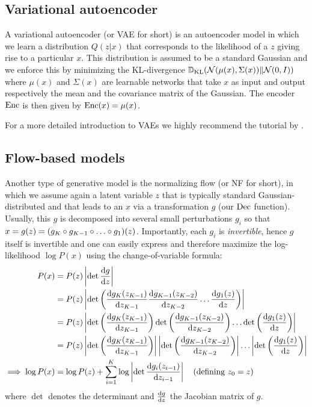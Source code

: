 \documentclass[../main.tex]{subfiles}
\begin{document}
\subsection{Variational autoencoder}

A variational autoencoder (or VAE for short) is an autoencoder model in which we learn a distribution $Q(z | x)$ that corresponds to the likelihood of a $z$ giving rise to a particular $x$.
This distribution is assumed to be a standard Gaussian and we enforce this by minimizing the KL-divergence $\mathbb{D}_\text{KL}(\mathcal{N}(\mu(x), \Sigma(x)) \| \mathcal{N}(0, I))$ where $\mu(x)$ and $\Sigma(x)$ are learnable networks that take $x$ as input and output respectively the mean and the covariance matrix of the Gaussian.
The encoder $\operatorname{Enc}$ is then given by $\operatorname{Enc}(x) = \mu(x)$.

For a more detailed introduction to VAEs we highly recommend the tutorial by \citeauthor{doerschTutorial2021} \cite{doerschTutorial2021}.

\subsection{Flow-based models}

Another type of generative model is the normalizing flow (or NF for short), in which we assume again a latent variable $z$ that is typically standard Gaussian-distributed and that leads to an $x$ via a transformation $g$ (our $\operatorname{Dec}$ function).
Usually, this $g$ is decomposed into several small perturbations $g_i$ so that $x = g(z) = (g_K \circ g_{K-1} \circ \ldots \circ g_1) (z)$.
Importantly, each $g_i$ is \emph{invertible}, hence $g$ itself is invertible and one can easily express and therefore maximize the log-likelihood $\log P(x)$ using the change-of-variable formula:
%
\begin{align*}
    P(x)               & = P(z) \left\lvert \det \frac{\mathrm{d} g}{\mathrm{d} z} \right\rvert       \\
                       & = P(z) \left\lvert \det \left(
        \frac{\mathrm{d} g_K(z_{K-1})}{\mathrm{d} z_{K-1}}
        \frac{\mathrm{d} g_{K-1}(z_{K-2})}{\mathrm{d} z_{K-2}}
        \ldots
        \frac{\mathrm{d} g_1(z)}{\mathrm{d} z}
    \right)\right\rvert                                                   \\
                       & = P(z) \left\lvert
        \det \left(
        \frac{\mathrm{d} g_K(z_{K-1})}{\mathrm{d} z_{K-1}}
        \right)
        \det \left(
        \frac{\mathrm{d} g_{K-1}(z_{K-2})}{\mathrm{d} z_{K-2}}
        \right)
        \ldots
        \det \left(
        \frac{\mathrm{d} g_1(z)}{\mathrm{d} z}
        \right)
    \right\rvert                                                          \\
                       & = P(z) \left\lvert
        \det \left(
        \frac{\mathrm{d} g_K(z_{K-1})}{\mathrm{d} z_{K-1}}
        \right)
    \right\rvert
    \left\lvert
        \det \left(
        \frac{\mathrm{d} g_{K-1}(z_{K-2})}{\mathrm{d} z_{K-2}}
        \right)
    \right\rvert
    \ldots
    \left\lvert
        \det \left(
        \frac{\mathrm{d} g_1(z)}{\mathrm{d} z}
        \right)
    \right\rvert                                                          \\
    \implies \log P(x) & = \log P(z) + \sum_{i=1}^K \log \left\lvert
        \det \frac{\mathrm{d} g_i(z_{i-1})}{\mathrm{d} z_{i-1}}
    \right\rvert\quad \text{(defining $z_0 = z$)}
\end{align*}
where $\det$ denotes the determinant and $\frac{\mathrm{d} g}{\mathrm{d} z}$ the Jacobian matrix of $g$.
\end{document}
